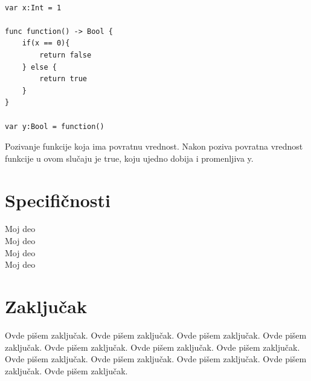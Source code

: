 \documentclass[a4paper]{article}
\begin{document}
\begin{lstlisting}[caption={},frame=single, label=simple]

var x:Int = 1

func function() -> Bool {
	if(x == 0){
		return false
	} else {
		return true
	}
}

var y:Bool = function()

\end{lstlisting}

Pozivanje funkcije koja ima povratnu vrednost. Nakon poziva povratna vrednost funkcije u ovom slučaju je true, koju ujedno dobija i promenljiva y.\\






\section{Specifičnosti}	
\label{sec:sedmiDeo}


Moj deo \\
Moj deo \\
Moj deo \\
Moj deo \\




\section{Zaključak}
\label{sec:zakljucak}

Ovde pišem zaključak. 
Ovde pišem zaključak. 
Ovde pišem zaključak. 
Ovde pišem zaključak. 
Ovde pišem zaključak. 
Ovde pišem zaključak. 
Ovde pišem zaključak. 
Ovde pišem zaključak. 
Ovde pišem zaključak. 
Ovde pišem zaključak. 
Ovde pišem zaključak. 
Ovde pišem zaključak. 


\appendix
 


\appendix
\end{document}
